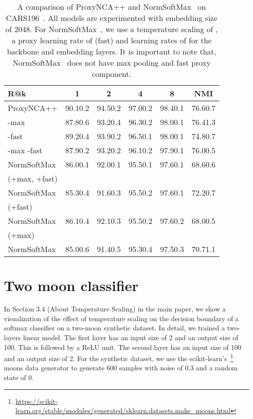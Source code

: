 \documentclass[runningheads]{llncs}
\begin{document}
\begin{table}[H]
\centering
\caption{A comparison of ProxyNCA++ and NormSoftMax~\cite{zhai2019} on CARS196~\cite{KrauseStarkDengFei-Fei_3DRR2013}.  All models are experimented with embedding size of 2048. For NormSoftMax~\cite{Zheng_2019_CVPR}, we use a temperature scaling of , a proxy learning rate of  (fast) and learning rates of  for the backbone and embedding layers. It is important to note that, NormSoftMax~\cite{zhai2019}  does not have max pooling and fast proxy component. }
\setlength{\tabcolsep}{3pt}
\begin{tabular}{|l|*5c|}
\hline
R@k & 1 & 2 & 4 & 8 & NMI \\
\hline
\small{ProxyNCA++} & 90.10.2 & 94.50.2 & 97.00.2 & 98.40.1 & 76.60.7 \\
\hspace{0.3cm}\small{-max}& 87.80.6 & 93.20.4 & 96.30.2 & 98.00.1 & 76.41.3 \\
\hspace{0.3cm}\small{-fast}& 89.20.4 & 93.90.2 & 96.50.1 & 98.00.1 & 74.80.7\\
\hspace{0.3cm}\small{-max -fast}& 87.90.2 & 93.20.2 & 96.10.2 & 97.90.1 & 76.00.5\\
\hline
\small{NormSoftMax} & 86.00.1 & 92.00.1 & 95.50.1 & 97.60.1 & 68.60.6 \\
\small{(+max, +fast)}& & & & &\\
\small{NormSoftMax} & 85.30.4 & 91.60.3 & 95.50.2 & 97.60.1 & 72.20.7 \\
\small{(+fast)}& & & & &\\
\small{NormSoftMax} & 86.10.4 & 92.10.3 & 95.50.2 & 97.60.2 & 68.00.5  \\
\small{(+max)}& & & & &\\
\small{NormSoftMax} & 85.00.6 & 91.40.5 & 95.30.4 & 97.50.3 & 70.71.1 \\
\hline
\end{tabular}
\label{table:cars_nsm}
\end{table}

\newpage

\section{Two moon classifier}

In Section 3.4 (About Temperature Scaling) in the main paper, we show a visualization of the effect of temperature scaling on the decision boundary of a softmax classifier on a two-moon synthetic dataset. In detail, we trained a two-layers linear model. The first layer has an input size of 2 and an output size of 100. This is followed by a ReLU unit. The second layer has an input size of 100 and an output size of 2. For the synthetic dataset, we use the scikit-learn's~\footnote[2]{\url{https://scikit-learn.org/stable/modules/generated/sklearn.datasets.make_moons.html}} moons data generator to generate 600 samples with noise of 0.3 and a random state of 0. 
\end{document}
